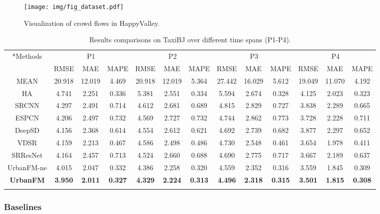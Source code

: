 \begin{figure}[h!]
	\centering
	\texttt{[image: img/fig\_dataset.pdf]}
	\caption{Visualization of crowd flows in HappyValley.}
	\vspace{-1em}	
	\label{fig:dataset}
\end{figure}

\begin{table*}[!t]
  \centering
\caption{\label{tab:main_bj}Results comparisons on TaxiBJ over different time spans (P1-P4).}
  \vspace{-0.8em}
  \tabcolsep=0.22cm
    \begin{tabular}{c|ccc|ccc|ccc|ccc}
    \shline
    \multirow{2}*{Methods} & \multicolumn{3}{c|}{P1} & \multicolumn{3}{c|}{P2} & \multicolumn{3}{c|}{P3} & \multicolumn{3}{c}{P4} \\
\cline{2-13}           & RMSE  & MAE   & MAPE  & RMSE  & MAE   & MAPE  & RMSE  & MAE   & MAPE  & RMSE  & MAE   & MAPE \\
    \hline
    MEAN  & 20.918 & 12.019 & 4.469 & 20.918 & 12.019 & 5.364 & 27.442 & 16.029 & 5.612 & 19.049 & 11.070 & 4.192 \\

    HA    & 4.741 & 2.251 & 0.336 & 5.381 & 2.551 & 0.334 & 5.594 & 2.674 & 0.328 & 4.125 & 2.023 & 0.323 \\
    \hline
    SRCNN & 4.297 & 2.491 & 0.714 & 4.612 & 2.681 & 0.689 & 4.815 & 2.829 & 0.727 & 3.838 & 2.289 & 0.665 \\

    ESPCN & 4.206 & 2.497 & 0.732 & 4.569 & 2.727 & 0.732 & 4.744 & 2.862 & 0.773 & 3.728 & 2.228 & 0.711 \\

    DeepSD & 4.156 & 2.368 & 0.614 & 4.554 & 2.612 & 0.621 & 4.692 & 2.739 & 0.682 & 3.877 & 2.297 & 0.652 \\
    \hline
    VDSR  & 4.159 & 2.213 & 0.467 & 4.586 & 2.498 & 0.486 & 4.730 & 2.548 & 0.461 & 3.654 & 1.978 & 0.411 \\

    SRResNet & 4.164 & 2.457 & 0.713 & 4.524 & 2.660 & 0.688 & 4.690 & 2.775 & 0.717 & 3.667 & 2.189 & 0.637 \\

    \hline
    UrbanFM-ne & 4.015 & 2.047 & 0.332 & 4.386 & 2.258 & 0.320 & 4.559 & 2.352 & 0.316 & 3.559 & 1.845 & 0.309 \\

    \textbf{UrbanFM} & \textbf{3.950} & \textbf{2.011} & \textbf{0.327} & \textbf{4.329} & \textbf{2.224} & \textbf{0.313} & \textbf{4.496} & \textbf{2.318} & \textbf{0.315} & \textbf{3.501} & \textbf{1.815} & \textbf{0.308} \\
    \shline

    \end{tabular}\end{table*} \subsubsection{Baselines}
